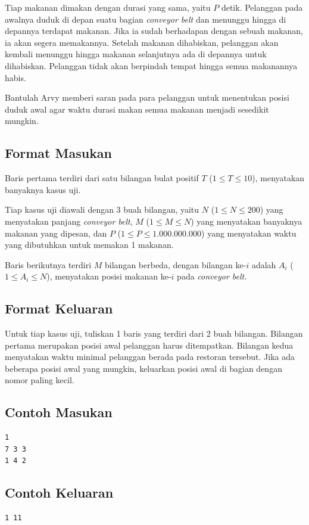 \documentclass{article}
\begin{document}
Tiap makanan dimakan dengan durasi yang sama, yaitu $P$ detik.
Pelanggan pada awalnya duduk di depan suatu bagian \textit{conveyor belt} dan menunggu hingga di depannya terdapat makanan.
Jika ia sudah berhadapan dengan sebuah makanan, ia akan segera memakannya.
Setelah makanan dihabiskan, pelanggan akan kembali menunggu hingga makanan selanjutnya ada di depannya untuk dihabiskan.
Pelanggan tidak akan berpindah tempat hingga semua makanannya habis.

Bantulah Arvy memberi saran pada para pelanggan untuk menentukan posisi duduk awal agar waktu durasi makan semua makanan menjadi sesedikit mungkin.

\subsection*{Format Masukan}

Baris pertama terdiri dari satu bilangan bulat positif $T$ ($1 \leq T \leq 10$), menyatakan banyaknya kasus uji.

Tiap kasus uji diawali dengan 3 buah bilangan, yaitu $N$ ($1 \leq N \leq 200$) yang menyatakan panjang \textit{conveyor belt}, $M$ ($1 \leq M \leq N$) yang menyatakan banyaknya makanan yang dipesan, dan $P$ ($1 \leq P \leq 1.000.000.000$) yang menyatakan waktu yang dibutuhkan untuk memakan 1 makanan.

Baris berikutnya terdiri $M$ bilangan berbeda, dengan bilangan ke-$i$ adalah $A_i$ ($1 \leq A_i \leq N$), menyatakan posisi makanan ke-$i$ pada \textit{conveyor belt}.

\subsection*{Format Keluaran}

Untuk tiap kasus uji, tuliskan 1 baris yang terdiri dari 2 buah bilangan.
Bilangan pertama merupakan posisi awal pelanggan harus ditempatkan.
Bilangan kedua menyatakan waktu minimal pelanggan berada pada restoran tersebut.
Jika ada beberapa posisi awal yang mungkin, keluarkan posisi awal di bagian dengan nomor paling kecil.
\\

\begin{multicols}{2}
\subsection*{Contoh Masukan}
\begin{lstlisting}
1
7 3 3
1 4 2
\end{lstlisting}
\columnbreak
\subsection*{Contoh Keluaran}
\begin{lstlisting}
1 11
\end{lstlisting}
\vfill
\null
\end{multicols}
\end{document}
